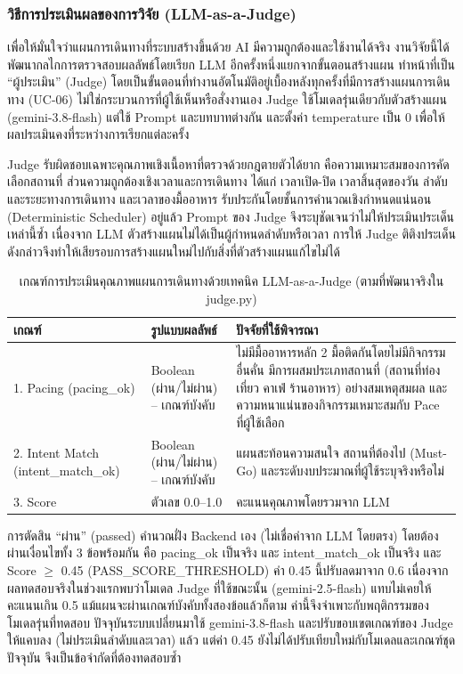 \subsubsection{วิธีการประเมินผลของการวิจัย (LLM-as-a-Judge)}

เพื่อให้มั่นใจว่าแผนการเดินทางที่ระบบสร้างขึ้นด้วย AI มีความถูกต้องและใช้งานได้จริง งานวิจัยนี้ได้พัฒนากลไกการตรวจสอบผลลัพธ์โดยเรียก LLM อีกครั้งหนึ่งแยกจากขั้นตอนสร้างแผน ทำหน้าที่เป็น ``ผู้ประเมิน'' (Judge) โดยเป็นขั้นตอนที่ทำงานอัตโนมัติอยู่เบื้องหลังทุกครั้งที่มีการสร้างแผนการเดินทาง (UC-06) ไม่ใช่กระบวนการที่ผู้ใช้เห็นหรือสั่งงานเอง Judge ใช้โมเดลรุ่นเดียวกับตัวสร้างแผน (gemini-3.8-flash) แต่ใช้ Prompt และบทบาทต่างกัน และตั้งค่า temperature เป็น 0 เพื่อให้ผลประเมินคงที่ระหว่างการเรียกแต่ละครั้ง

Judge รับผิดชอบเฉพาะคุณภาพเชิงเนื้อหาที่ตรวจด้วยกฎตายตัวได้ยาก คือความเหมาะสมของการคัดเลือกสถานที่ ส่วนความถูกต้องเชิงเวลาและการเดินทาง ได้แก่ เวลาเปิด-ปิด เวลาสิ้นสุดของวัน ลำดับและระยะทางการเดินทาง และเวลาของมื้ออาหาร รับประกันโดยชั้นการคำนวณเชิงกำหนดแน่นอน (Deterministic Scheduler) อยู่แล้ว Prompt ของ Judge จึงระบุชัดเจนว่าไม่ให้ประเมินประเด็นเหล่านี้ซ้ำ เนื่องจาก LLM ตัวสร้างแผนไม่ได้เป็นผู้กำหนดลำดับหรือเวลา การให้ Judge ติติงประเด็นดังกล่าวจึงทำให้เสียรอบการสร้างแผนใหม่ไปกับสิ่งที่ตัวสร้างแผนแก้ไขไม่ได้

\begin{table}[H]
\centering
\caption{เกณฑ์การประเมินคุณภาพแผนการเดินทางด้วยเทคนิค LLM-as-a-Judge (ตามที่พัฒนาจริงใน judge.py)}
\label{tab:llm_judge}
\begin{tabular}{|p{5.2cm}|p{2.8cm}|p{6cm}|}
\hline
\textbf{เกณฑ์} & \textbf{รูปแบบผลลัพธ์} & \textbf{ปัจจัยที่ใช้พิจารณา} \\
\hline
1. Pacing (pacing\_ok) & Boolean (ผ่าน/ไม่ผ่าน) -- เกณฑ์บังคับ & ไม่มีมื้ออาหารหลัก 2 มื้อติดกันโดยไม่มีกิจกรรมอื่นคั่น มีการผสมประเภทสถานที่ (สถานที่ท่องเที่ยว คาเฟ่ ร้านอาหาร) อย่างสมเหตุสมผล และความหนาแน่นของกิจกรรมเหมาะสมกับ Pace ที่ผู้ใช้เลือก \\ \hline
2. Intent Match (intent\_match\_ok) & Boolean (ผ่าน/ไม่ผ่าน) -- เกณฑ์บังคับ & แผนสะท้อนความสนใจ สถานที่ต้องไป (Must-Go) และระดับงบประมาณที่ผู้ใช้ระบุจริงหรือไม่ \\ \hline
3. Score & ตัวเลข 0.0--1.0 & คะแนนคุณภาพโดยรวมจาก LLM \\
\hline
\end{tabular}
\end{table}

การตัดสิน ``ผ่าน'' (passed) คำนวณฝั่ง Backend เอง (ไม่เชื่อค่าจาก LLM โดยตรง) โดยต้องผ่านเงื่อนไขทั้ง 3 ข้อพร้อมกัน คือ pacing\_ok เป็นจริง และ intent\_match\_ok เป็นจริง และ Score $\geq$ 0.45 (PASS\_SCORE\_THRESHOLD) ค่า 0.45 นี้ปรับลดมาจาก 0.6 เนื่องจากผลทดสอบจริงในช่วงแรกพบว่าโมเดล Judge ที่ใช้ขณะนั้น (gemini-2.5-flash) แทบไม่เคยให้คะแนนเกิน 0.5 แม้แผนจะผ่านเกณฑ์บังคับทั้งสองข้อแล้วก็ตาม ค่านี้จึงจำเพาะกับพฤติกรรมของโมเดลรุ่นที่ทดสอบ ปัจจุบันระบบเปลี่ยนมาใช้ gemini-3.8-flash และปรับขอบเขตเกณฑ์ของ Judge ให้แคบลง (ไม่ประเมินลำดับและเวลา) แล้ว แต่ค่า 0.45 ยังไม่ได้ปรับเทียบใหม่กับโมเดลและเกณฑ์ชุดปัจจุบัน จึงเป็นข้อจำกัดที่ต้องทดสอบซ้ำ


